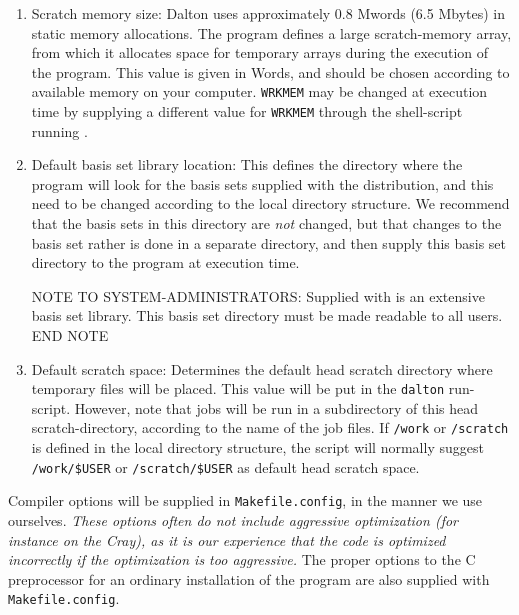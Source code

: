 \begin{enumerate}
\item Scratch memory
size: Dalton uses approximately 0.8 Mwords (6.5 Mbytes)
in static memory allocations. The program defines a large scratch-memory
array, from which it allocates space for temporary arrays
during the execution of the program. This value is given in Words, and
should be chosen according to available memory on your computer.
\verb|WRKMEM| may be changed at execution time by supplying a
different value for \verb|WRKMEM| through the shell-script running
{\dalton}.

\item Default basis set library
location: This defines the directory where the program will look for the
basis sets supplied with the distribution, and this need to be
changed according to the local directory structure. We recommend
that the basis sets in this directory are {\em not} changed, but
that changes to the basis set rather is done in a separate
directory, and then supply this basis set directory to the program
at execution time.

{\sc NOTE TO SYSTEM-ADMINISTRATORS:} Supplied with {\dalton} is an
extensive basis set library. This basis set directory must be made
readable to all users. {\sc END NOTE}

\item Default scratch
space:
Determines the default head scratch
directory where temporary files will be placed. This value will be put
in the \verb|dalton| run-script. However, note that jobs will be run in
a subdirectory of this head scratch-directory, according to the name
of the job files. If \verb|/work| or \verb|/scratch| is defined in the
local directory structure, the script will normally suggest
\verb|/work/$USER| or  \verb|/scratch/$USER| as default head scratch space.

\end{enumerate}

Compiler options will be supplied in \verb|Makefile.config|, in the manner
we use ourselves. {\em These options often do not include aggressive
optimization (for instance on the Cray), as
it is our experience that
the code is optimized incorrectly if the optimization is too
aggressive.} The proper options to the C preprocessor for an ordinary
installation of the program are also supplied with
\verb|Makefile.config|.

